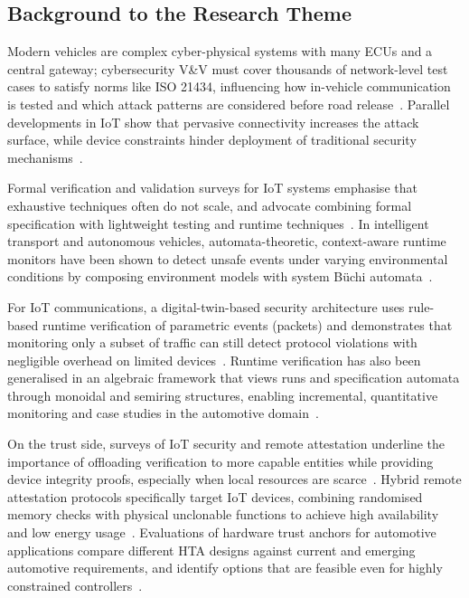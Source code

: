 \subsection{Background to the Research Theme}

Modern vehicles are complex cyber-physical systems with many ECUs and a central gateway; cybersecurity V\&V must cover thousands of network-level test cases to satisfy norms like ISO 21434, influencing how in-vehicle communication is tested and which attack patterns are considered before road release~\cite{ekert2021cybersecurity}. Parallel developments in IoT show that pervasive connectivity increases the attack surface, while device constraints hinder deployment of traditional security mechanisms~\cite{williams2022survey}.

Formal verification and validation surveys for IoT systems emphasise that exhaustive techniques often do not scale, and advocate combining formal specification with lightweight testing and runtime techniques~\cite{krichen2023survey}. In intelligent transport and autonomous vehicles, automata-theoretic, context-aware runtime monitors have been shown to detect unsafe events under varying environmental conditions by composing environment models with system B\"uchi automata~\cite{zhang2024context}.

For IoT communications, a digital-twin-based security architecture uses rule-based runtime verification of parametric events (packets) and demonstrates that monitoring only a subset of traffic can still detect protocol violations with negligible overhead on limited devices~\cite{dehoz2022iotdt}. Runtime verification has also been generalised in an algebraic framework that views runs and specification automata through monoidal and semiring structures, enabling incremental, quantitative monitoring and case studies in the automotive domain~\cite{jaksic2018algebraic}.

On the trust side, surveys of IoT security and remote attestation underline the importance of offloading verification to more capable entities while providing device integrity proofs, especially when local resources are scarce~\cite{williams2022survey,saadat2024rosmonitoring2}. Hybrid remote attestation protocols specifically target IoT devices, combining randomised memory checks with physical unclonable functions to achieve high availability and low energy usage~\cite{plappert2023hta}. Evaluations of hardware trust anchors for automotive applications compare different HTA designs against current and emerging automotive requirements, and identify options that are feasible even for highly constrained controllers~\cite{plappert2023hta}.

